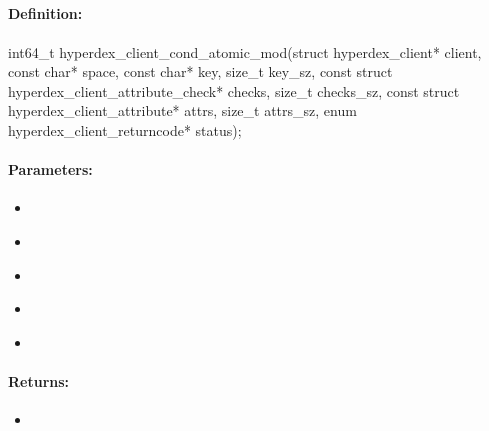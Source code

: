 \pagebreak
\subsection{}
\label{api:c:cond_atomic_mod}


\paragraph{Definition:}
\begin{ccode}
int64_t hyperdex_client_cond_atomic_mod(struct hyperdex_client* client,
        const char* space,
        const char* key, size_t key_sz,
        const struct hyperdex_client_attribute_check* checks, size_t checks_sz,
        const struct hyperdex_client_attribute* attrs, size_t attrs_sz,
        enum hyperdex_client_returncode* status);
\end{ccode}

\paragraph{Parameters:}
\begin{itemize}[noitemsep]
\item {}\\

\item {}\\

\item {}\\

\item {}\\

\item {}\\

\end{itemize}

\paragraph{Returns:}
\begin{itemize}[noitemsep]
\item {}\\

\end{itemize}

